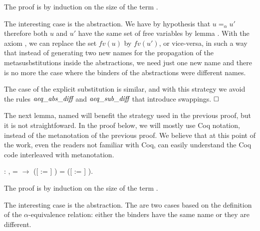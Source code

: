  The proof is by induction on the size of the term .
\begin{coqdoccode}
\end{coqdoccode}
The interesting case is the abstraction. We have by hypothesis that $u =_\alpha u'$ therefore both $u$ and $u'$ have the same set of free variables by lemma . With the axiom , we can replace the set $fv(u)$ by $fv(u')$, or vice-versa, in such a way that instead of generating two new names for the propagation of the metasusbstitutions inside the abstractions, we need just one new name and there is no more the case where the binders of the abstractions were different names. 
\begin{coqdoccode}
\end{coqdoccode}
The case of the explicit substitution is similar, and with this strategy we avoid the rules $\mbox{\it aeq}\_\mbox{\it abs}\_\mbox{\it diff}$ and $\mbox{\it aeq}\_\mbox{\it sub}\_\mbox{\it diff}$ that introduce swappings. $\hfill\Box$
\begin{coqdoccode}
\end{coqdoccode}
\newline 
\begin{coqdoccode}
\coqdocemptyline
\coqdocemptyline
\end{coqdoccode}
The next lemma, named  will benefit the strategy used in the previous proof, but it is not straightfoward. In the proof below, we will mostly use Coq notation, instead of the metanotation of the previous proof. We believe that at this point of the work, even the readers not familiar with Coq, can easily understand the Coq code interleaved with metanotation. 
\begin{coqdoccode}
\coqdocnoindent
{} : \coqdockw{\ensuremath{\forall}}    ,  =  \ensuremath{\rightarrow} ([ := ] ) = ([ := ] ).\coqdoceol
\end{coqdoccode}
 The proof is by induction on the size of the term . 
\begin{coqdoccode}
\end{coqdoccode}
The interesting case is the abstraction. The are two cases based on the definition of the $\alpha$-equivalence relation: either the binders have the same name or they are different. 

